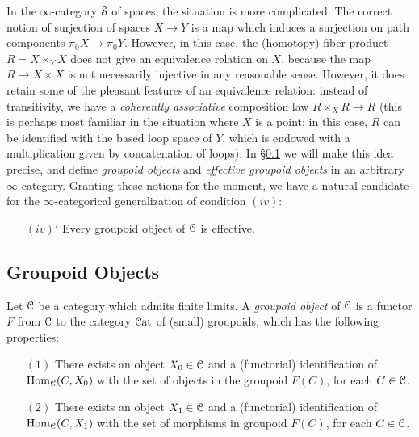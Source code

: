 In the $\infty$-category $\operatorname{\mathcal{S}}$ of spaces, the situation is more complicated.
The correct notion of surjection of spaces $X \rightarrow Y$ is a map which
induces a surjection on path components $\pi_0 X \rightarrow \pi_0 Y$.
However, in this case, the (homotopy) fiber product $R= X \times_Y X$ does
not give an equivalence relation on $X$, because the map $R
\rightarrow X \times X$ is not necessarily injective in any
reasonable sense. However, it does retain some of the pleasant
features of an equivalence relation: instead of transitivity, we
have a {\it coherently associative} composition law $R \times_X R
\rightarrow R$ (this is perhaps most familiar in the situation where $X$ is a point: in this case, $R$ can be identified with the based loop space of $Y$, which is endowed with a multiplication given by concatenation of loops). In \S \ref{gengroup} we will make this idea precise, and define {\it groupoid objects} and {\it effective groupoid objects} in an arbitrary $\infty$-category. Granting these notions
for the moment, we have a natural candidate for the $\infty$-categorical generalization
of condition $(iv)$:

\begin{itemize}
\item[$(iv)'$] Every groupoid object of $\operatorname{\mathcal{C}}$ is effective.
\end{itemize}

\subsection{Groupoid Objects}\label{gengroup}

Let $\operatorname{\mathcal{C}}$ be a category which admits finite limits. A {\it groupoid object} of $\operatorname{\mathcal{C}}$ is a functor $F$ from $\operatorname{\mathcal{C}}$ to the category $\operatorname{\mathcal{C}at}$ of (small) groupoids, which has the following properties:

\begin{itemize}
\item[$(1)$] There exists an object $X_0 \in \operatorname{\mathcal{C}}$ and a (functorial) identification of
$\operatorname{Hom}_{\operatorname{\mathcal{C}}}(C,X_0)$ with the set of objects in the groupoid $F(C)$, for each $C \in \operatorname{\mathcal{C}}$.
\item[$(2)$] There exists an object $X_1 \in \operatorname{\mathcal{C}}$ and a (functorial) identification of
$\operatorname{Hom}_{\operatorname{\mathcal{C}}}(C,X_1)$ with the set of morphisms in groupoid $F(C)$, for each $C \in \operatorname{\mathcal{C}}$.
\end{itemize}

